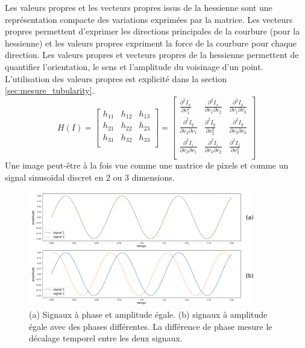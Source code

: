 Les valeurs propres et les vecteurs propres issus de la hessienne sont une représentation compacte des variations exprimées par la matrice. Les vecteurs propres permettent d'exprimer les directions principales de la courbure (pour la hessienne) et les valeurs propres expriment la force de la courbure pour chaque direction.
Les valeurs propres et vecteurs propres de la hessienne permettent de quantifier l'orientation, le sens et l'amplitude du voisinage d'un point. L'utilisation des valeurs propres est explicité dans la section \ref{sec:mesure_tubularity}.
\begin{equation}
  H(I) =
  \begin{bmatrix}
  h_{11} & h_{12} & h_{13} \\
  h_{21} & h_{22} & h_{23} \\
  h_{31} & h_{32} & h_{33} \\
  \end{bmatrix}
    =
  \begin{bmatrix}
  \frac{\partial^2 I_x}{\partial v^2_1} & \frac{\partial^2 I_x}{\partial v_1 \partial v_2} & \frac{\partial^2 I_x}{\partial v_1 \partial v_3} \\
  \frac{\partial^2 I_y}{\partial v_2 \partial v_1} & \frac{\partial^2 I_y}{\partial v^2_2} & \frac{\partial^2 I_y}{\partial v_2 \partial v_3} \\
  \frac{\partial^2 I_z}{\partial v_3 \partial v_1} & \frac{\partial^2 I_z}{\partial v_3 \partial v_2} & \frac{\partial^2 I_z}{\partial v^2_3} \\
  \end{bmatrix}
  \label{eq:hessian_matrix}
\end{equation}
\label{sec:EA:rehaussement:Phase}
Une image peut-être à la fois vue comme une matrice de pixels et comme un signal sinusoïdal discret en 2 ou 3 dimensions. 
\begin{figure}[!ht]
  \centering
  \includegraphics[height=5cm]{Images/phase_shift.png}
  \caption{(a) Signaux à phase et amplitude égale. (b) signaux à amplitude égale avec des phases différentes. La différence de phase mesure le décalage temporel entre les deux signaux.}
  \label{fig:phase_shift}
\end{figure}
